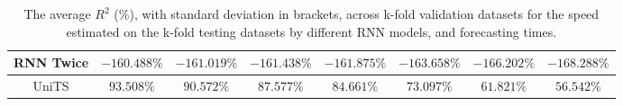 \begin{table}[!ht]
{\begin{tabular}{|c|c|c|c|c|c|c|c|}
			RNN Twice & $-160.488\%$ & $-161.019\%$ & $-161.438\%$ & $-161.875\%$ & $-163.658\%$ & $-166.202\%$ & $-168.288\%$ \\ \hline
			UniTS & $93.508\%$ & $\mathbf{90.572\%}$ & $\mathbf{87.577\%}$ & $\mathbf{84.661\%}$ & $\mathbf{73.097\%}$ & $\mathbf{61.821\%}$ & $\mathbf{56.542\%}$ \\ \hline
		\end{tabular}
	}
	\caption{The average $R^{2}$ (\%), with standard deviation in brackets, across k-fold validation datasets for the speed estimated on the k-fold testing datasets by different RNN models, and forecasting times.}
	\label{tab:all_speed_R2}
\end{table}